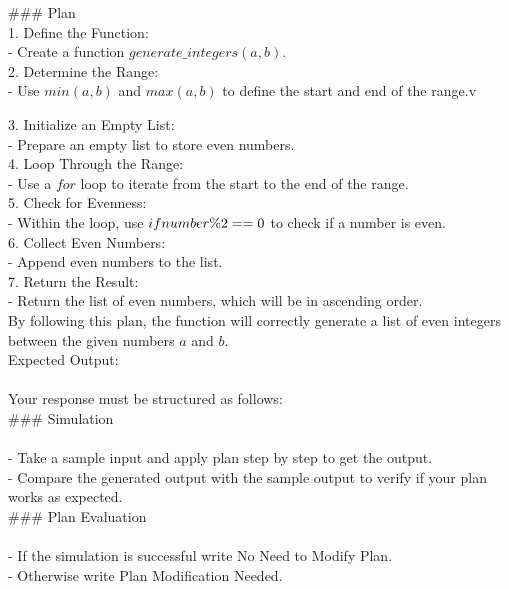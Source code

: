 \#\#\# Plan \\

1. \*\*Define the Function:\*\* \\
   - Create a function $generate\_integers(a, b)$. \\

2. \*\*Determine the Range:\*\* \\
   - Use $min(a, b)$ and $max(a, b)$ to define the start and end of the range.v

3. \*\*Initialize an Empty List:\*\* \\
   - Prepare an empty list to store even numbers. \\

4. \*\*Loop Through the Range:\*\* \\
   - Use a $for$ loop to iterate from the start to the end of the range. \\

5. \*\*Check for Evenness:\*\* \\
   - Within the loop, use $if \space number \% 2 == 0$ to check if a number is even. \\

6. \*\*Collect Even Numbers:\*\* \\
   - Append even numbers to the list. \\

7. \*\*Return the Result:\*\* \\
   - Return the list of even numbers, which will be in ascending order. \\

By following this plan, the function will correctly generate a list of even integers between the given numbers $a$ and $b$. \\

\*\*Expected Output:\*\* \\
 \\
Your response must be structured as follows: \\

\#\#\# Simulation \\
 \\
- Take a sample input and apply plan step by step to get the output. \\
- Compare the generated output with the sample output to verify if your plan works as expected. \\

\#\#\# Plan Evaluation \\
 \\
- If the simulation is successful write \*\*No Need to Modify Plan\*\*. \\
- Otherwise write \*\*Plan Modification Needed\*\*. \\


